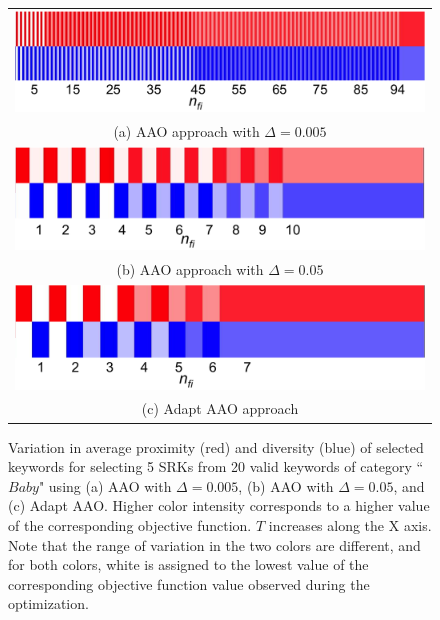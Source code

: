 \begin{figure}
\centering
\begin{tabular}{c}
\includegraphics[width=0.85\linewidth]{TrainingData/figs/pt005proxdivAAO2.png} \\ 
(a) AAO approach with $\Delta=0.005$ \\ 
\includegraphics[width=0.85\linewidth]{TrainingData/figs/pt05proxdivAAO2.png} \\ 
(b) AAO approach with $\Delta=0.05$ \\ 
\includegraphics[width=0.85\linewidth]{TrainingData/figs/proxdivadaptAAO2.png} \\ 
(c) Adapt AAO approach 
\end{tabular} 
\caption{Variation in average proximity (red) and diversity (blue) of selected keywords for selecting 5 SRKs from 20 valid keywords of category ``$Baby$" using (a)  AAO with $\Delta=0.005$, (b) AAO with $\Delta=0.05$, and (c) Adapt AAO. Higher color intensity corresponds to a higher value of the corresponding objective function. $T$ increases along the X axis. Note that the range of variation in the two colors are different, and for both colors, white is assigned to the lowest value of the corresponding objective function value observed during the optimization. }
\label{fig:proxdivVariationAAO}
\end{figure}


